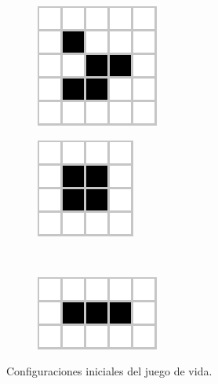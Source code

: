 \documentclass[../proyecto.tex]{book}
\begin{document}
\begin{figure}[H]
	\centering
	\begin{subfigure}[b]{0.3\linewidth} 
        \centering
        \includegraphics[height=.6\linewidth]{./images/glider.png}
        \caption{}
        \label{fig:1-1}
    \end{subfigure}
    \quad
	\begin{subfigure}[b]{0.3\linewidth} 
        \centering
        \includegraphics[height=.55\linewidth]{./images/block.png}
        \caption{}
        \label{fig:1-2}
    \end{subfigure}
	\\    
    \begin{subfigure}[b]{0.3\linewidth} 
        \centering
        \includegraphics[height=0.45\linewidth]{./images/blinker.png}
        \caption{}
        \label{fig:1-3}
    \end{subfigure}
	\caption{Configuraciones iniciales del juego de vida.}
	\label{fig:congIniciales}
\end{figure} 
\end{document}
